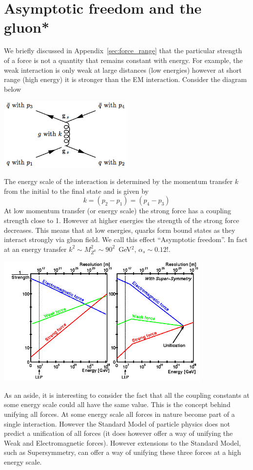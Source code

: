 \section{Asymptotic freedom and the gluon*}
\label{sec:asymptotic_freedom}
We briefly discussed in Appendix~\ref{sec:force_range} that the particular strength of a force
is not a quantity that remains constant with energy. For example, the weak interaction is only weak at large distances (low energies) however at short range (high energy) it is stronger than the EM interaction. Consider the diagram below

\begin{center}
\includegraphics[width=0.5\textwidth]{fig/strongforce/strong_mom_transf.png}
\end{center}
The energy scale of the interaction is determined by the momentum transfer $k$ from the initial to the final state and is given by
\[
k=(p_2-p_1)=(p_4-p_3)
\]
At low momentum transfer (or energy scale) the strong force has a coupling strength close to 1. However at higher energies the strength of the strong force decreases. This means that at low energies, quarks form bound states as they interact strongly via gluon field. We call this effect ``Asymptotic freedom''. In fact at an energy transfer $k^2\sim M_{Z^0}^2\sim 90^2$~GeV$^2$, $\alpha_s\sim0.12$!.
\begin{center}
\includegraphics[width=0.8\textwidth]{fig/strongforce/running_coupling.png}
\end{center}
As an aside, it is interesting to consider the fact that all the coupling constants at some energy scale could all have the same value. This is the concept behind unifying all forces. At some energy scale all forces in nature become part of a single interaction. However the Standard Model of particle physics does not predict a unification of all forces (it does however offer a way of unifying the Weak and Electromagnetic forces). However extensions to the Standard Model, such as Supersymmetry, can offer a way of unifying these three forces at a high energy scale.
